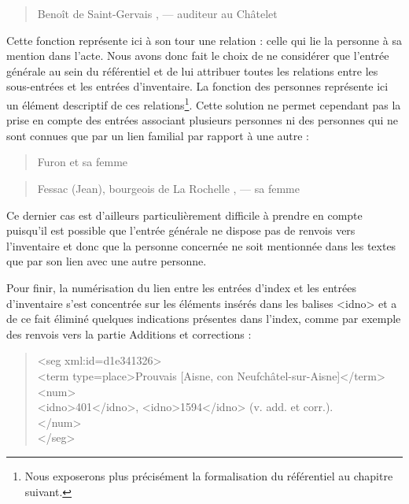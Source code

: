 \documentclass[a4paper,12pt,twoside]{book}
\begin{document}
	\begin{quotation}
		Benoît de Saint-Gervais , — auditeur au Châtelet
	\end{quotation}
	
	Cette fonction représente ici à son tour une relation : celle qui lie la personne à sa mention dans l'acte. Nous avons donc fait le choix de ne considérer que l'entrée générale au sein du référentiel et de lui attribuer toutes les relations entre les sous-entrées et les entrées d'inventaire. La fonction des personnes représente ici un élément descriptif de ces relations\footnote{Nous exposerons plus précisément la formalisation du référentiel au chapitre suivant.}. Cette solution ne permet cependant pas la prise en compte des entrées associant plusieurs personnes ni des personnes qui ne sont connues que par un lien familial par rapport à une autre :
	
	\begin{quotation}
		Furon et sa femme
	\end{quotation}

	\begin{quotation}
		Fessac (Jean), bourgeois de La Rochelle , — sa femme
	\end{quotation}

	\noindent Ce dernier cas est d'ailleurs particulièrement difficile à prendre en compte puisqu'il est possible que l'entrée générale ne dispose pas de renvois vers l'inventaire et donc que la personne concernée ne soit mentionnée dans les textes que par son lien avec une autre personne.
	
	Pour finir, la numérisation du lien entre les entrées d'index et les entrées d'inventaire s'est concentrée sur les éléments insérés dans les balises <idno> et a de ce fait éliminé quelques indications présentes dans l'index, comme par exemple des renvois vers la partie \og Additions et corrections\fg{} :
	
	\begin{quotation}
		<seg xml:id=\textquotesingle d1e341326\textquotesingle >\\
		\indent\indent<term type=\textquotesingle place\textquotesingle >Prouvais [Aisne, con Neufchâtel-sur-Aisne]</term>\\
		\indent\indent<num>\\
		\indent\indent{}401</idno>, <idno>1594</idno> (v. add. et corr.).\\
		\indent{}\\
		\\
	\end{quotation}
	
\end{document}
